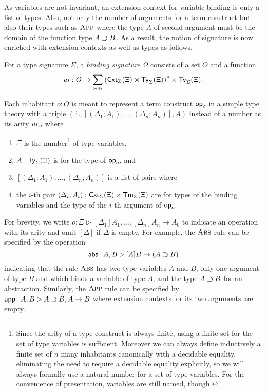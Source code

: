 As variables are not invariant, an extension context for variable binding is only a list of types.
Also, not only the number of arguments for a term construct but also their types such as $\textnormal{\textsc{App}}$ where the type $A$ of second argument must be the domain of the function type $A \mathbin{\bm{\supset}} B$.
As a result, the notion of signature is now enriched with extension contexts as well as types as follows.

\begin{definition}\label{def:binding-signature}
  For a type signature $\Sigma$, a \emph{binding signature} $\Omega$ consists of a set $O$ and a function
  \[
    \mathit{ar}\colon O \to \sum_{\Xi : \mathbb{N}} \left(\mathsf{Cxt}_\Sigma(\Xi) \times \mathsf{Ty}_\Sigma(\Xi)\right)^* \times \mathsf{Ty}_\Sigma(\Xi).
  \]
\end{definition}
Each inhabitant $o: O$ is meant to represent a term construct $\mathsf{op}_o$ in a simple type theory with a triple $\left(\Xi, \left[\left(\Delta_1; A_1\right), \ldots, \left(\Delta_{n}; A_{n}\right) \right], A\right)$
instead of a number as its arity $\mathit{ar}_o$ where
\begin{enumerate}
  \item $\Xi$ is the number\footnote{%
    Since the arity of a type construct is always finite, using a finite set for the set of type variables is sufficient.
    Moreover we can always define inductively a finite set of $n$ many inhabitants canonically with a decidable equality, eliminating the need to require a decidable equality explicitly, so we will always formally use a natural number for a set of type variables.
    For the convenience of presentation, variables are still named, though.}
  of type variables, 
  \item $A : \mathsf{Ty}_\Sigma(\Xi)$ is for the type of $\mathsf{op}_o$, and
  \item $\left[\left(\Delta_1; A_{1}\right), \ldots, \left(\Delta_{n}; A_{n}\right) \right]$ is a list of pairs where
  \item the $i$-th pair $(\Delta_i, A_i) :\mathsf{Cxt}_{\Sigma}(\Xi) \times \mathsf{Tm}_{\Sigma}(\Xi)$ are for types of the binding variables and the type of the $i$-th argument of $\mathsf{op}_{o}$.
\end{enumerate}
For brevity, we write $o \colon \Xi \rhd [\Delta_1]A_{1}, \ldots, \left[\Delta_{n}\right] A_{n} \to A_0$ to indicate an operation with its arity and omit $[\Delta]$ if $\Delta$ is empty. 
For example, the $\textnormal{\textsc{Abs}}$ rule can be specified by the operation 
\[
  \mathsf{abs}\colon A , B \rhd [A]B \to (A \mathbin{\bm{\supset}} B)
\]
indicating that the rule $\textnormal{\textsc{Abs}}$ has two type variables $A$ and $B$, only one argument of type $B$ and which binds a variable of type $A$, and the type $A \mathbin{\bm{\supset}} B$ for an abstraction.
Similarly, the $\textnormal{\textsc{App}}$ rule can be specified by $\mathsf{app}\colon A, B \rhd A \mathbin{\bm{\supset}} B, A \to B$ where extension contexts for its two arguments are empty.

